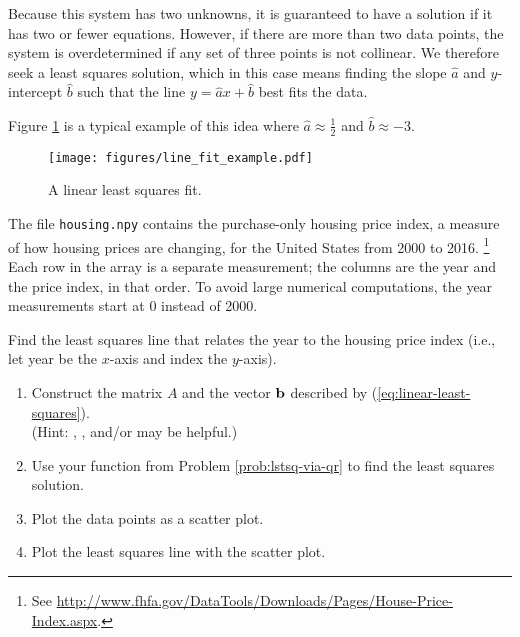 Because this system has two unknowns, it is guaranteed to have a solution if it has two or fewer equations.
However, if there are more than two data points, the system is overdetermined if any set of three points is not collinear.
We therefore seek a least squares solution, which in this case means finding the slope $\widehat{a}$ and $y$-intercept $\widehat{b}$ such that the line $y = \widehat{a}x+\widehat{b}$ best fits the data.

Figure \ref{fig:line-fit-example} is a typical example of this idea where $\widehat{a} \approx \frac{1}{2}$ and $\widehat{b} \approx -3$.

\begin{figure}[H] %
    \texttt{[image: figures/line\_fit\_example.pdf]}
    \caption{A linear least squares fit.}
    \label{fig:line-fit-example}
\end{figure}

\begin{problem}
The file \texttt{housing.npy} contains the purchase-only housing price index, a measure of how housing prices are changing, for the United States from 2000 to 2016.%
\footnote{See \url{http://www.fhfa.gov/DataTools/Downloads/Pages/House-Price-Index.aspx}.}
Each row in the array is a separate measurement; the columns are the year and the price index, in that order.
To avoid large numerical computations, the year measurements start at 0 instead of 2000.

Find the least squares line that relates the year to the housing price index (i.e., let year be the $x$-axis and index the $y$-axis).

\begin{enumerate}
    \item Construct the matrix $A$ and the vector $\mathbf{b}$ described by (\ref{eq:linear-least-squares}).\\
    (Hint: , , and/or  may be helpful.)
    \item Use your function from Problem \ref{prob:lstsq-via-qr} to find the least squares solution.
    \item Plot the data points as a scatter plot.
    \item Plot the least squares line with the scatter plot.\\
\end{enumerate}
\end{problem}

